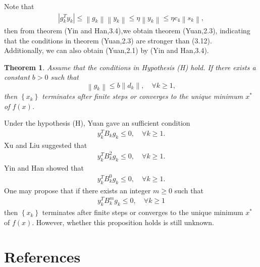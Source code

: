 \documentclass[12pt,a4paper,draft]{article}  %
\newcounter{cite}
\newtheorem{theorem}{Theorem}[section]
\theoremstyle{definition}
\numberwithin{equation}{section}
\begin{document}
Note that
\begin{align*}
    \left|g_k^T y_k\right| \leq\left\|g_k\right\|\left\|y_k\right\| \leq \eta\left\|y_k\right\| \leq \eta c_4\left\|s_k\right\|,
\end{align*}
then from theorem (Yin and Han,3.4),we obtain theorem (Yuan,2.3), indicating that the conditions in theorem (Yuan,2.3) are stronger than  (3.12).\\
Additionally, we can also obtain (Yuan,2.1) by (Yin and Han,3.4).

\begin{theorem}
    Assume that the conditions in Hypothesis (H) hold. If there exists a constant $b>0$ such that \begin{equation*}
    \left\|g_k\right\| \leq b\left\|d_k\right\|, \quad \forall k \geq 1,
\end{equation*}
then $\left\{x_k\right\}$ terminates after finite steps or converges to the unique minimum $x^{*}$ of $f(x)$.
\end{theorem}

Under the hypothesis (H), Yuan\cite{Yuan} gave an sufficient condition
\begin{align*}
    y_k^T B_k g_k \leq 0, \quad \forall k \geq 1.
\end{align*}
Xu and Liu\cite{XL} suggested that
\begin{align*}
    y_k^T B_k^2 g_k \leq 0, \quad \forall k \geq 1.
\end{align*}
Yin and Han\cite{YH} showed that
\begin{align*}
    y_k^T B_k^0 g_k \leq 0, \quad \forall k \geq 1.
\end{align*}
One may propose that if there exists an integer $m\geq0$ such that
\begin{align*}
    y_k^T B_k^m g_k \leq 0, \quad \forall k \geq 1
\end{align*}
then $\left\{x_k\right\}$ terminates after finite steps or converges to the unique minimum $x^{*}$ of $f(x)$. However, whether this proposition holds is still unknown.



\section{References}
\end{document}
